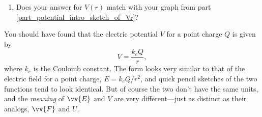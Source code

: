 \begin{enumerate}[labparts]
\item Does your answer for $V(r)$ match with your graph from part \ref{part_potential_intro_sketch_of_Vr}?
\answerspace{0.5in}



\end{enumerate}

You should have found that the electric potential $V$ for a point charge $Q$ is given by
$$V=\frac{k_eQ}{r},$$
where $k_e$ is the Coulomb constant.  The form looks very similar to that of the electric field for a point charge, $E={k_eQ}/{r^2}$, and quick pencil sketches of the two functions tend to look identical.  But of course the two don't have the same units, and the \textit{meaning} of $\vv{E}$ and $V$ are very different---just as distinct as their analogs, $\vv{F}$ and $U$.  
  



